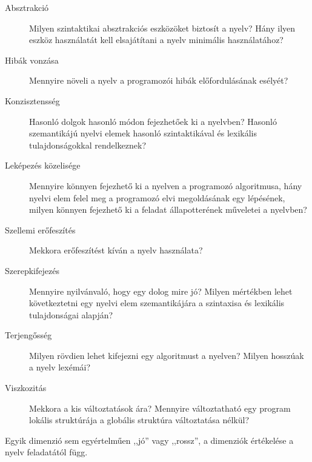 \begin{description}
	\item[Absztrakció] Milyen szintaktikai absztrakciós eszközöket biztosít a nyelv? Hány ilyen eszköz használatát kell elsajátítani a nyelv minimális használatához?
	\item[Hibák vonzása] Mennyire növeli a nyelv a programozói hibák előfordulásának esélyét?
	\item[Konzisztensség] Hasonló dolgok hasonló módon fejezhetőek ki a nyelvben? Hasonló szemantikájú nyelvi elemek hasonló szintaktikával és lexikális tulajdonságokkal rendelkeznek?
	\item[Leképezés közelisége] Mennyire könnyen fejezhető ki a nyelven a programozó algoritmusa, hány nyelvi elem felel meg a programozó elvi megoldásának egy lépésének, milyen könnyen fejezhető ki a feladat állapotterének műveletei a nyelvben?
	\item[Szellemi erőfeszítés] Mekkora erőfeszítést kíván a nyelv használata?
	\item[Szerepkifejezés] Mennyire nyilvánvaló, hogy egy dolog mire jó? Milyen mértékben lehet következtetni egy nyelvi elem szemantikájára a szintaxisa és lexikális tulajdonságai alapján?
	\item[Terjengősség] Milyen rövdien lehet kifejezni egy algoritmust a nyelven? Milyen hosszúak a nyelv lexémái?
	\item[Viszkozitás] Mekkora a kis változtatások ára? Mennyire változtatható egy program lokális struktúrája a globális struktúra változtatása nélkül?
\end{description}

Egyik dimenzió sem egyértelműen ,,jó'' vagy ,,rossz'', a dimenziók értékelése a nyelv feladatától függ.


